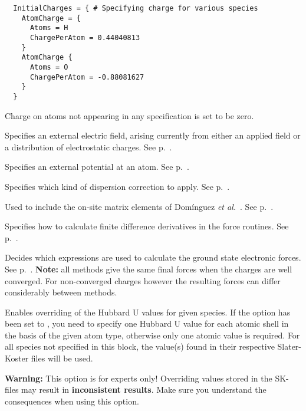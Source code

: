\begin{description}
\begin{verbatim}
  InitialCharges = { # Specifying charge for various species
    AtomCharge = {
      Atoms = H
      ChargePerAtom = 0.44040813
    }
    AtomCharge {
      Atoms = O
      ChargePerAtom = -0.88081627
    }
  }
\end{verbatim}
  Charge on atoms not appearing in any 
  specification is set to be zero.


\item[\is{ElectricField}] Specifies an external electric field,
  arising currently from either an applied field or a distribution of
  electrostatic charges. See p.~.

\item[\is{AtomSitePotential}] Specifies an external potential at an atom. See
  p.~.

\item[\is{Dispersion}] Specifies which kind of dispersion correction
  to apply. See p.~.

\item[\is{OnSiteCorrection}] Used to include the on-site matrix elements of
  Dom\'inguez {\it et al.}~\cite{dominguez15}. See p.~.

\item[\is{Differentiation}] Specifies how to calculate finite difference
  derivatives in the force routines. See p.~.

\item[\is{ForceEvaluation}] Decides which expressions are used to calculate the ground state
  electronic forces.  See p.~. \textbf{Note:} all methods give the same final
  forces when the charges are well converged. For non-converged charges however the resulting forces
  can differ considerably between methods.

\item[\is{CustomisedHubbards} / \is{CustomizedHubbards}] Enables overriding of
  the Hubbard U values for given species. If the option 
  has been set to , you need to specify one Hubbard U value for each
  atomic shell in the basis of the given atom type, otherwise only one atomic
  value is required. For all species not specified in this block, the value(s)
  found in their respective Slater-Koster files will be used.

  \textbf{Warning:} This option is for experts only! Overriding values stored in the SK-files may
  result in \textbf{inconsistent results}. Make sure you understand the consequences when using this
  option.


\end{description}
